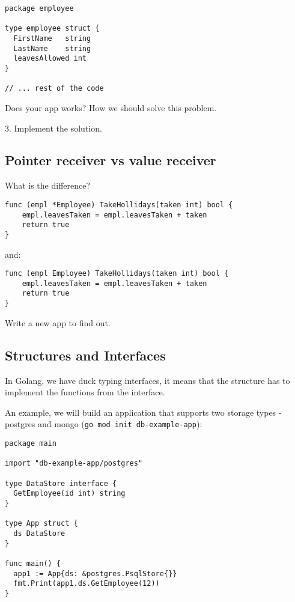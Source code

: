 \documentclass[11pt, letterpaper]{article}
\begin{document}
\begin{verbatim}
package employee

type employee struct {
  FirstName   string
  LastName    string
  leavesAllowed int
}

// ... rest of the code
\end{verbatim}

Does your app works? How we should solve this problem.

\bigskip

3. Implement the solution.



\subsection{Pointer receiver vs value receiver}

What is the difference?

\begin{verbatim}
func (empl *Employee) TakeHollidays(taken int) bool {
    empl.leavesTaken = empl.leavesTaken + taken
    return true
}
\end{verbatim}

and:

\begin{verbatim}
func (empl Employee) TakeHollidays(taken int) bool {
    empl.leavesTaken = empl.leavesTaken + taken
    return true
}
\end{verbatim}

Write a new app to find out.

\subsection{Structures and Interfaces}

In Golang, we have duck typing interfaces, it means that the structure has to implement the functions from the interface.

An example, we will build an application that supports two storage types - postgres and mongo (\texttt{go mod init db-example-app}):

\begin{verbatim}
package main

import "db-example-app/postgres"

type DataStore interface {
  GetEmployee(id int) string
}

type App struct {
  ds DataStore
}

func main() {
  app1 := App{ds: &postgres.PsqlStore{}}
  fmt.Print(app1.ds.GetEmployee(12))
}
\end{verbatim}
\end{document}
